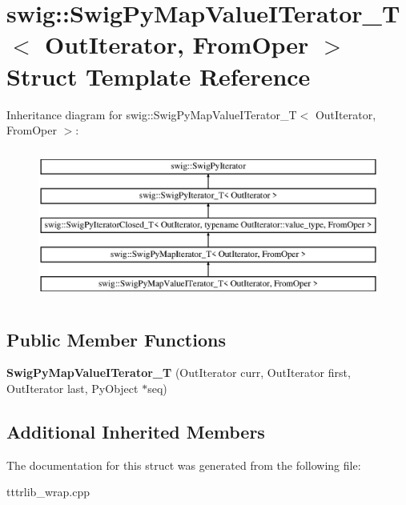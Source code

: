 \hypertarget{structswig_1_1_swig_py_map_value_i_terator___t}{}\section{swig\+:\+:Swig\+Py\+Map\+Value\+I\+Terator\+\_\+T$<$ Out\+Iterator, From\+Oper $>$ Struct Template Reference}
\label{structswig_1_1_swig_py_map_value_i_terator___t}
Inheritance diagram for swig\+:\+:Swig\+Py\+Map\+Value\+I\+Terator\+\_\+T$<$ Out\+Iterator, From\+Oper $>$\+:\begin{figure}[H]
\begin{center}
\leavevmode
\includegraphics[height=5.000000cm]{structswig_1_1_swig_py_map_value_i_terator___t}
\end{center}
\end{figure}
\subsection*{Public Member Functions}
\begin{DoxyCompactItemize}
\item 
\mbox{\label{structswig_1_1_swig_py_map_value_i_terator___t_ac052c444538753f8a9e977240f6bb93e}} 
{\bfseries Swig\+Py\+Map\+Value\+I\+Terator\+\_\+T} (Out\+Iterator curr, Out\+Iterator first, Out\+Iterator last, Py\+Object $\ast$seq)
\end{DoxyCompactItemize}
\subsection*{Additional Inherited Members}


The documentation for this struct was generated from the following file\+:\begin{DoxyCompactItemize}
\item 
tttrlib\+\_\+wrap.\+cpp\end{DoxyCompactItemize}

